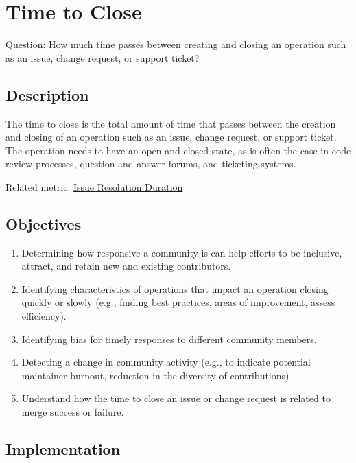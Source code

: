 \hypertarget{time-to-close}{%
\section{Time to Close}\label{time-to-close}}

Question: How much time passes between creating and closing an operation
such as an issue, change request, or support ticket?

\hypertarget{description}{%
\subsection{Description}\label{description}}

The time to close is the total amount of time that passes between the
creation and closing of an operation such as an issue, change request,
or support ticket. The operation needs to have an open and closed state,
as is often the case in code review processes, question and answer
forums, and ticketing systems.

Related metric:
\href{https://chaoss.community/metric-issue-resolution-duration/}{Issue
Resolution Duration}

\hypertarget{objectives}{%
\subsection{Objectives}\label{objectives}}

\begin{enumerate}
\def\labelenumi{\arabic{enumi}.}
\tightlist
\item
  Determining how responsive a community is can help efforts to be
  inclusive, attract, and retain new and existing contributors.
\item
  Identifying characteristics of operations that impact an operation
  closing quickly or slowly (e.g., finding best practices, areas of
  improvement, assess efficiency).
\item
  Identifying bias for timely responses to different community members.
\item
  Detecting a change in community activity (e.g., to indicate potential
  maintainer burnout, reduction in the diversity of contributions)
\item
  Understand how the time to close an issue or change request is related
  to merge success or failure.
\end{enumerate}

\hypertarget{implementation}{%
\subsection{Implementation}\label{implementation}}

